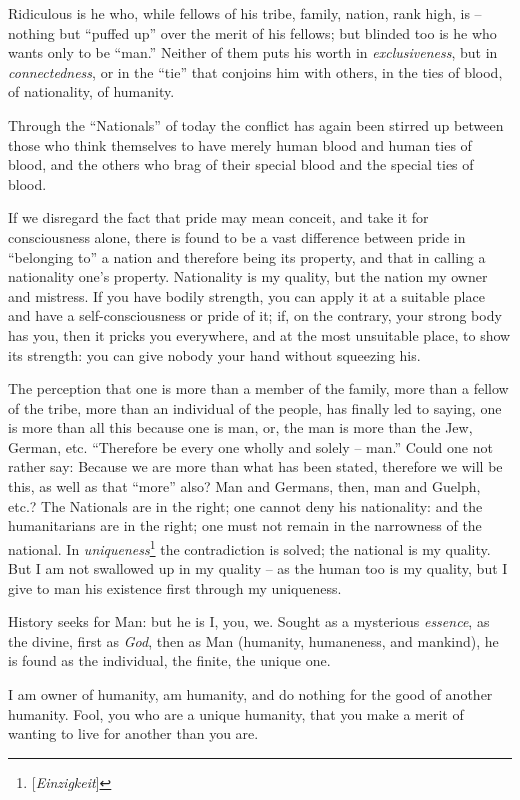 \documentclass[12pt,a4paper]{book}
\begin{document}
Ridiculous is he who, while fellows of his tribe, family, nation, rank high, 
is -- nothing but ``puffed up'' over the merit of his fellows; but blinded 
too is he who wants only to be ``man.'' Neither of them puts his worth in 
\textit{exclusiveness}, but in \textit{connectedness}, or in the ``tie'' 
that conjoins him with others, in the ties of blood, of nationality, of 
humanity.

Through the ``Nationals'' of today the conflict has again been stirred up 
between those who think themselves to have merely human blood and human ties 
of blood, and the others who brag of their special blood and the special ties 
of blood.

If we disregard the fact that pride may mean conceit, and take it for 
consciousness alone, there is found to be a vast difference between pride in 
``belonging to'' a nation and therefore being its property, and that in 
calling a nationality one's property. Nationality is my quality, but the 
nation my owner and mistress. If you have bodily strength, you can apply it at 
a suitable place and have a self-consciousness or pride of it; if, on the 
contrary, your strong body has you, then it pricks you everywhere, and at the 
most unsuitable place, to show its strength: you can give nobody your hand 
without squeezing his.

The perception that one is more than a member of the family, more than a 
fellow of the tribe, more than an individual of the people, has finally led to 
saying, one is more than all this because one is man, or, the man is more than 
the Jew, German, etc. ``Therefore be every one wholly and solely -- man.'' 
Could one not rather say: Because we are more than what has been stated, 
therefore we will be this, as well as that ``more'' also? Man and Germans, 
then, man and Guelph, etc.? The Nationals are in the right; one cannot deny 
his nationality: and the humanitarians are in the right; one must not remain 
in the narrowness of the national. In 
\textit{uniqueness}\footnote{[\textit{Einzigkeit}]} the contradiction is 
solved; the national is my quality. But I am not swallowed up in my quality -- 
as the human too is my quality, but I give to man his existence first through 
my uniqueness.

History seeks for Man: but he is I, you, we. Sought as a mysterious 
\textit{essence}, as the divine, first as \textit{God}, then as Man (humanity, 
humaneness, and mankind), he is found as the individual, the finite, the 
unique one.

I am owner of humanity, am humanity, and do nothing for the good of another 
humanity. Fool, you who are a unique humanity, that you make a merit of 
wanting to live for another than you are.
\end{document}
